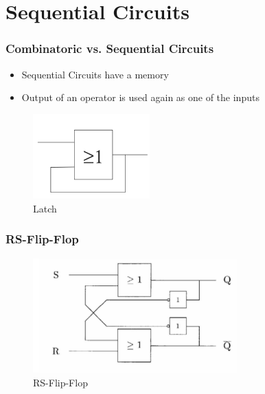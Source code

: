 \documentclass{beamer}
\begin{document}
\section{Sequential Circuits}
\frame{\tableofcontents[currentsection]}


\begin{frame}\frametitle{Combinatoric vs. Sequential Circuits}
\begin{itemize}
 \item Sequential Circuits have a memory
 \item Output of an operator is used again as one of the inputs
\end{itemize}


\begin{figure}[H]
\centering
  \includegraphics[width=0.4\textwidth]{loop}%
  \caption{Latch}%
  \label{fig:loop}
\end{figure}
\end{frame}

\begin{frame}\frametitle{RS-Flip-Flop}
\begin{figure}[H]
\centering
  \includegraphics[width=0.7\textwidth]{RSFF}%
  \caption{RS-Flip-Flop}%
  \label{fig:RSFF}
\end{figure}
\end{frame}
\end{document}
